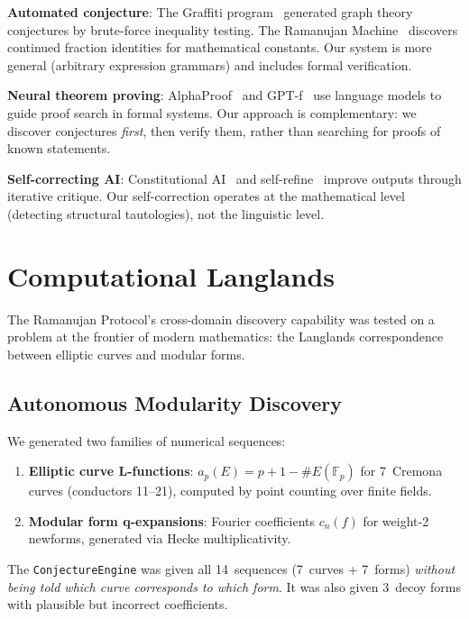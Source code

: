 \documentclass[11pt,a4paper]{article}
\begin{document}
\textbf{Automated conjecture}: The Graffiti program~\citep{fajtlowicz1988}
generated graph theory conjectures by brute-force inequality testing.
The Ramanujan Machine~\citep{raayoni2021} discovers continued fraction
identities for mathematical constants. Our system is more general (arbitrary
expression grammars) and includes formal verification.

\textbf{Neural theorem proving}: AlphaProof~\citep{deepmind2024} and
GPT-f~\citep{polu2020} use language models to guide proof search in formal
systems. Our approach is complementary: we discover conjectures
\emph{first}, then verify them, rather than searching for proofs of known
statements.

\textbf{Self-correcting AI}: Constitutional AI~\citep{bai2022} and
self-refine~\citep{madaan2023} improve outputs through iterative critique.
Our self-correction operates at the mathematical level (detecting
structural tautologies), not the linguistic level.


\section{Computational Langlands}
\label{sec:langlands}

The Ramanujan Protocol's cross-domain discovery capability was tested on
a problem at the frontier of modern mathematics: the Langlands
correspondence between elliptic curves and modular forms.

\subsection{Autonomous Modularity Discovery}

We generated two families of numerical sequences:
\begin{enumerate}
  \item \textbf{Elliptic curve L-functions}: $a_p(E) = p + 1 - \#E(\mathbb{F}_p)$
    for 7~Cremona curves (conductors 11--21), computed by point counting
    over finite fields.
  \item \textbf{Modular form q-expansions}: Fourier coefficients $c_n(f)$
    for weight-2 newforms, generated via Hecke multiplicativity.
\end{enumerate}

The \texttt{ConjectureEngine} was given all 14~sequences (7~curves +
7~forms) \emph{without being told which curve corresponds to which form}.
It was also given 3~decoy forms with plausible but incorrect coefficients.
\end{document}
